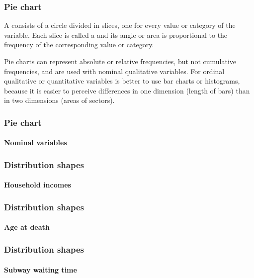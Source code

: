 \begin{frame}
\frametitle{Pie chart}
A  consists of a circle divided in slices, one for every value or category of the variable. 
Each slice is called a  and its angle or area is proportional to the frequency of the corresponding
value or category. 

Pie charts can represent absolute or relative frequencies, but not cumulative frequencies, and are used with nominal qualitative variables.
For ordinal qualitative or quantitative variables is better to use bar charts or histograms, because it is easier to perceive differences in one dimension (length of bars) than in two dimensions (areas of sectors).
\end{frame}


\begin{frame}
\frametitle{Pie chart}
\framesubtitle{Nominal variables}
\begin{center}
\scalebox{0.6}{}
\end{center}
\end{frame}


\begin{frame}
\frametitle{Distribution shapes}
\framesubtitle{Household incomes}
\begin{center}
\scalebox{0.6}{}
\end{center} 
\end{frame}


\begin{frame}
\frametitle{Distribution shapes}
\framesubtitle{Age at death}
\begin{center}
\scalebox{0.6}{}
\end{center} 
\end{frame}


\begin{frame}
\frametitle{Distribution shapes}
\framesubtitle{Subway waiting time}
\begin{center}
\scalebox{0.6}{}
\end{center} 
\end{frame}


